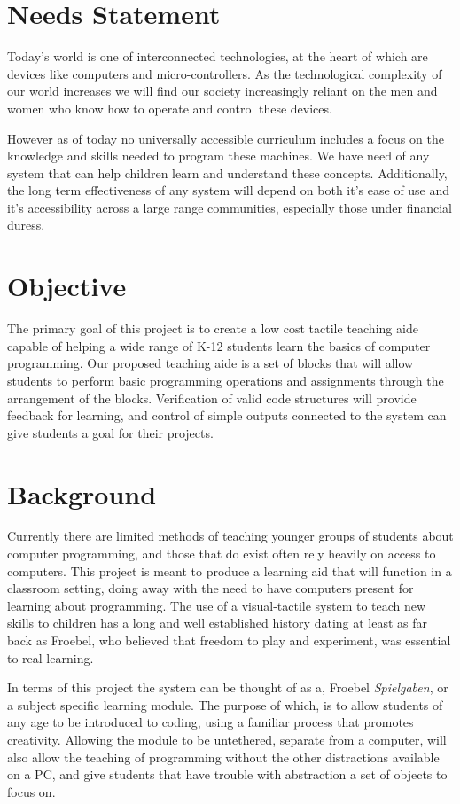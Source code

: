\section{Needs Statement}
Today's world is one of interconnected technologies, at the heart of which are devices like computers and micro-controllers. As the technological complexity of our world increases we will find our society increasingly reliant on the men and women who know how to operate and control these devices.


However as of today no universally accessible curriculum includes a focus on the knowledge and skills needed to program these machines. We have need of any system that can help children learn and understand these concepts. Additionally,  the long term effectiveness of any system will depend on both it's ease of use and it's accessibility across a large range communities, especially those under financial duress.


\section{Objective}
The primary goal of this project is to create a low cost tactile teaching aide capable of helping a wide range of K-12 students learn the basics of computer programming. Our proposed teaching aide is a set of blocks that will allow students to  perform basic programming operations and assignments through the arrangement of the blocks. Verification of valid code structures will provide feedback for learning, and control of simple outputs connected to the system can give students a goal for their projects.
\newpage


\section{Background}

Currently there are limited methods of teaching  younger groups of students about computer programming, and those that do exist often rely heavily on access to computers. This project is meant to produce a learning aid that will function in a classroom setting, doing away with the need to have computers present for learning about programming.
The use of a visual-tactile system to teach new skills to children has a long and well established history dating at least as far back as Froebel, who believed that freedom to play and experiment, was essential to real learning.

 In terms of this project the system can be thought of as a, Froebel \textit{Spielgaben}, or a subject specific learning module. The purpose of which, is to allow students of any age to be introduced to coding, using a familiar process that promotes creativity. Allowing the module to be untethered, separate from a computer, will also allow the teaching of programming without the other distractions available on a PC, and give students that have trouble with abstraction a set of objects to focus on.

